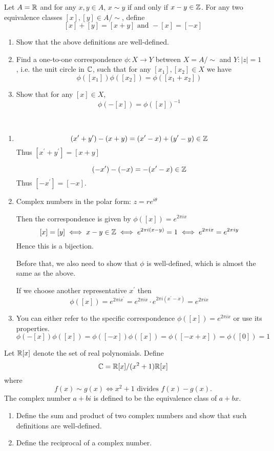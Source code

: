 \begin{prbm}
Let $A = \mathbb R$ and for any $x, y \in A$, $x \sim y$ if and only if $x-y \in \mathbb Z$. For any two equivalence classes $[x], [y] \in A/\sim$, define
\[ [x] + [y] = [x + y] \text{ and } -[x] = [-x] \]
\begin{enumerate}[label=(\alph*)]
\item Show that the above definitions are well-defined.
\item Find a one-to-one correspondence $\phi:X \to Y$ between $X = A/\sim$ and $Y:|z| = 1$, i.e. the unit circle in $\mathbb C$, such that for any $[x_1], [x_2] \in X$ we have
\[ \phi([x_1])\phi([x_2]) = \phi([x_1 + x_2]) \]
\item Show that for any $[x] \in X$,
\[ \phi(-[x]) = \phi([x])^{-1} \]
\end{enumerate}
\end{prbm}

\begin{solution} \ 
\begin{enumerate}[label=(\alph*)]
\item 
\[ (x^\prime+y^\prime)-(x+y)=(x^\prime-x)+(y^\prime-y)\in \mathbb Z \]
Thus $[x^\prime+y^\prime]=[x+y]$

\[ (-x^\prime)-(-x)=-(x^\prime-x)\in \mathbb Z \]
Thus $[-x^\prime]=[-x]$.

\item Complex numbers in the polar form: $z=re^{i\theta}$

Then the correspondence is given by $\phi([x])=e^{2\pi ix}$
\[ [x]=[y] \iff x-y\in \mathbb Z \iff e^{2\pi i(x-y)}=1 \iff e^{2\pi ix}=e^{2\pi iy} \]
Hence this is a bijection.

Before that, we also need to show that $\phi$ is well-defined, which is almost the same as the above.

If we choose another representative $x^\prime$ then
\[ \phi([x])=e^{2\pi ix^\prime} = e^{2\pi ix}\cdot e^{2\pi i(x^\prime-x)} = e^{2\pi ix} \]

\item You can either refer to the specific correspondence $\phi([x])=e^{2\pi ix}$ or use its properties.
\[ \phi(-[x])\phi([x]) = \phi([-x])\phi([x]) = \phi([-x+x]) = \phi([0]) = 1 \]
\end{enumerate}
\end{solution}
\pagebreak

\begin{prbm}
Let $\mathbb R[x]$ denote the set of real polynomials. Define
\[ \mathbb C=\mathbb R[x]/(x^2+1)\mathbb R[x] \]
where
\[ f(x)\sim g(x) \iff x^2+1 \text{ divides } f(x)-g(x). \]
The complex number $a+bi$ is defined to be the equivalence class of $a+bx$.
\begin{enumerate}[label=(\alph*)]
\item Define the sum and product of two complex numbers and show that such definitions are well-defined.
\item Define the reciprocal of a complex number.
\end{enumerate}
\end{prbm}
\pagebreak